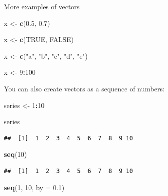 \documentclass[
]{book}
\newenvironment{Shaded}{\begin{snugshade}}{\end{snugshade}}
\newcommand{\AttributeTok}[1]{\textcolor[rgb]{0.13,0.29,0.53}{#1}}
\newcommand{\ConstantTok}[1]{\textcolor[rgb]{0.56,0.35,0.01}{#1}}
\newcommand{\DecValTok}[1]{\textcolor[rgb]{0.00,0.00,0.81}{#1}}
\newcommand{\FloatTok}[1]{\textcolor[rgb]{0.00,0.00,0.81}{#1}}
\newcommand{\FunctionTok}[1]{\textcolor[rgb]{0.13,0.29,0.53}{\textbf{#1}}}
\newcommand{\NormalTok}[1]{#1}
\newcommand{\OtherTok}[1]{\textcolor[rgb]{0.56,0.35,0.01}{#1}}
\newcommand{\SpecialCharTok}[1]{\textcolor[rgb]{0.81,0.36,0.00}{\textbf{#1}}}
\newcommand{\StringTok}[1]{\textcolor[rgb]{0.31,0.60,0.02}{#1}}
\begin{document}
More examples of vectors

\begin{Shaded}
\begin{Highlighting}[]
\NormalTok{x }\OtherTok{\textless{}{-}} \FunctionTok{c}\NormalTok{(}\FloatTok{0.5}\NormalTok{, }\FloatTok{0.7}\NormalTok{)}

\NormalTok{x }\OtherTok{\textless{}{-}} \FunctionTok{c}\NormalTok{(}\ConstantTok{TRUE}\NormalTok{, }\ConstantTok{FALSE}\NormalTok{)}

\NormalTok{x }\OtherTok{\textless{}{-}} \FunctionTok{c}\NormalTok{(}\StringTok{"a"}\NormalTok{, }\StringTok{"b"}\NormalTok{, }\StringTok{"c"}\NormalTok{, }\StringTok{"d"}\NormalTok{, }\StringTok{"e"}\NormalTok{)}

\NormalTok{x }\OtherTok{\textless{}{-}} \DecValTok{9}\SpecialCharTok{:}\DecValTok{100}
\end{Highlighting}
\end{Shaded}

You can also create vectors as a sequence of numbers:

\begin{Shaded}
\begin{Highlighting}[]
\NormalTok{series }\OtherTok{\textless{}{-}} \DecValTok{1}\SpecialCharTok{:}\DecValTok{10}

\NormalTok{series}
\end{Highlighting}
\end{Shaded}

\begin{verbatim}
##  [1]  1  2  3  4  5  6  7  8  9 10
\end{verbatim}

\begin{Shaded}
\begin{Highlighting}[]
\FunctionTok{seq}\NormalTok{(}\DecValTok{10}\NormalTok{)}
\end{Highlighting}
\end{Shaded}

\begin{verbatim}
##  [1]  1  2  3  4  5  6  7  8  9 10
\end{verbatim}

\begin{Shaded}
\begin{Highlighting}[]
\FunctionTok{seq}\NormalTok{(}\DecValTok{1}\NormalTok{, }\DecValTok{10}\NormalTok{, }\AttributeTok{by =} \FloatTok{0.1}\NormalTok{)}
\end{Highlighting}
\end{Shaded}
\end{document}
